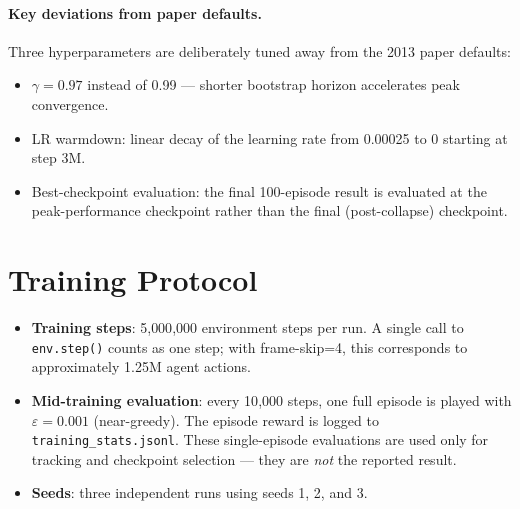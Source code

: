 \documentclass[11pt,a4paper]{article}
\begin{document}
\paragraph{Key deviations from paper defaults.}
Three hyperparameters are deliberately tuned away from the 2013 paper defaults:
\begin{itemize}
  \item $\gamma = 0.97$ instead of 0.99 — shorter bootstrap horizon accelerates peak convergence.
  \item LR warmdown: linear decay of the learning rate from 0.00025 to 0 starting at step 3M.
  \item Best-checkpoint evaluation: the final 100-episode result is evaluated at the
        peak-performance checkpoint rather than the final (post-collapse) checkpoint.
\end{itemize}

\section{Training Protocol}

\begin{itemize}
  \item \textbf{Training steps}: 5{,}000{,}000 environment steps per run.
        A single call to \texttt{env.step()} counts as one step; with frame-skip=4,
        this corresponds to approximately 1.25M agent actions.
  \item \textbf{Mid-training evaluation}: every 10{,}000 steps, one full episode is
        played with $\varepsilon = 0.001$ (near-greedy). The episode reward is logged
        to \texttt{training\_stats.jsonl}. These single-episode evaluations are used
        only for tracking and checkpoint selection — they are \emph{not} the reported result.
  \item \textbf{Seeds}: three independent runs using seeds 1, 2, and 3.
\end{itemize}
\end{document}

